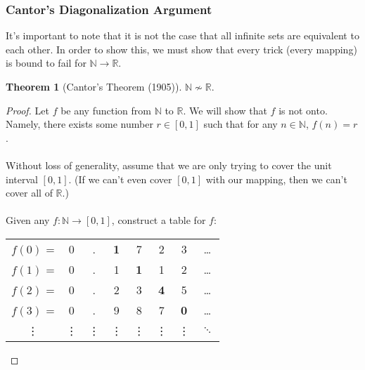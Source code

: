 \documentclass[]{article}
\theoremstyle{definition}
\newtheorem*{theorem}{Theorem}
\newcommand{\lecture}[1]{\marginpar{{\footnotesize $\leftarrow$ \underline{#1}}}}
\begin{document}
      \subsubsection{Cantor's Diagonalization Argument} \lecture{November 21, 2013}
      It's important to note that it is not the case that all infinite sets are equivalent to each other. In order to show this, we must show that every trick (every mapping) is bound to fail for $\mathbb{N} \to \mathbb{R}$.

      \begin{theorem}[Cantor's Theorem (1905)]
        $\mathbb{N} \not \sim \mathbb{R}$.
      \end{theorem}

      \begin{proof}
        Let $f$ be any function from $\mathbb{N}$ to $\mathbb{R}$. We will show that $f$ is not onto. Namely, there exists some number $r \in [0, 1]$ such that for any $n \in \mathbb{N}$, $f(n) = r$.
        \\ \\
        Without loss of generality, assume that we are only trying to cover the unit interval $[0, 1]$.  (If we can't even cover $[0, 1]$ with our mapping, then we can't cover all of $\mathbb{R}$.)
        \\ \\
        Given any $f: \mathbb{N} \to [0, 1]$, construct a table for $f$:
        \begin{center}
          \begin{tabular}{cccccccc}
            $f(0)$ = & 0 & . & \textbf{1} & 7 & 2 & 3 & \ldots \\
            $f(1)$ = & 0 & . & 1 & \textbf{1} & 1 & 2 & \ldots \\
            $f(2)$ = & 0 & . & 2 & 3 & \textbf{4} & 5 & \ldots \\
            $f(3)$ = & 0 & . & 9 & 8 & 7 & \textbf{0} & \ldots \\
            \vdots & \vdots & \vdots & \vdots & \vdots & \vdots & \vdots & $\boldsymbol{\ddots}$
          \end{tabular}
        \end{center}


\end{proof}
\end{document}
